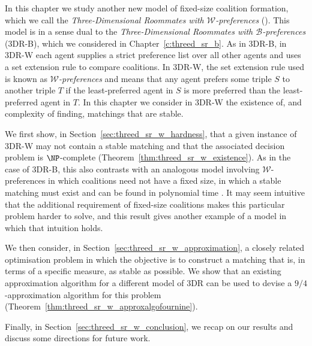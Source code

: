 In this chapter we study another new model of fixed-size coalition formation, which we call the \emph{Three-Dimensional Roommates with $\mathscr{W}$-preferences} (). This model is in a sense dual to the \emph{Three-Dimensional Roommates with $\mathscr{B}$-preferences} (3DR-B), which we considered in Chapter~\ref{c:threed_sr_b}. As in 3DR-B, in 3DR-W each agent supplies a strict preference list over all other agents and uses a set extension rule to compare coalitions. In 3DR-W, the set extension rule used is known as \emph{$\mathscr{W}$-preferences} \cite{CH04} and means that any agent prefers some triple $S$ to another triple $T$ if the least-preferred agent in $S$ is more preferred than the least-preferred agent in $T$. In this chapter we consider in 3DR-W the existence of, and complexity of finding, matchings that are stable.

We first show, in Section~\ref{sec:threed_sr_w_hardness}, that a given instance of 3DR-W may not contain a stable matching and that the associated decision problem is $\NP$-complete (Theorem~\ref{thm:threed_sr_w_existence}). As in the case of 3DR-B, this also contrasts with an analogous model involving $\mathscr{W}$-preferences in which coalitions need not have a fixed size, in which a stable matching must exist and can be found in polynomial time \cite{CH04}. It may seem intuitive that the additional requirement of fixed-size coalitions makes this particular problem harder to solve, and this result gives another example of a model in which that intuition holds.

We then consider, in Section~\ref{sec:threed_sr_w_approximation}, a closely related optimisation problem in which the objective is to construct a matching that is, in terms of a specific measure, as stable as possible. We show that an existing approximation algorithm for a different model of 3DR can be used to devise a $9/4$-approximation algorithm for this problem (Theorem~\ref{thm:threed_sr_w_approxalgofournine}).

Finally, in Section~\ref{sec:threed_sr_w_conclusion}, we recap on our results and discuss some directions for future work.

